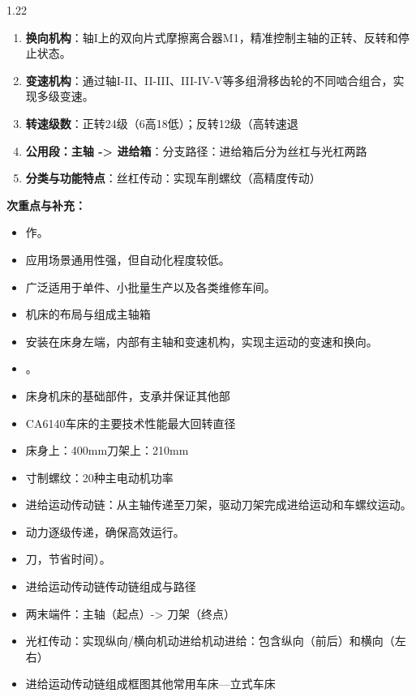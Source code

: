 \documentclass[12pt,a4paper]{article}
\begin{document}
\begin{spacing}{1.22}
\begin{tcolorbox}[colback=yellow!6,colframe=red!55!black,title=重点,left=1mm,right=1mm]
\begin{enumerate}[leftmargin=2.2em,label=\arabic*.]
  \item \textbf{换向机构}：轴I上的双向片式摩擦离合器M1，精准控制主轴的正转、反转和停止状态。
  \item \textbf{变速机构}：通过轴I-II、II-III、III-IV-V等多组滑移齿轮的不同啮合组合，实现多级变速。
  \item \textbf{转速级数}：正转24级（6高18低）；反转12级（高转速退
  \item \textbf{公用段：主轴 -> 进给箱}：分支路径：进给箱后分为丝杠与光杠两路
  \item \textbf{分类与功能特点}：丝杠传动：实现车削螺纹（高精度传动）
\end{enumerate}
\end{tcolorbox}
\noindent\textbf{次重点与补充：}
\begin{itemize}[leftmargin=2.2em,label=--]
  \item 作。
  \item 应用场景通用性强，但自动化程度较低。
  \item 广泛适用于单件、小批量生产以及各类维修车间。
  \item 机床的布局与组成主轴箱
  \item 安装在床身左端，内部有主轴和变速机构，实现主运动的变速和换向。
  \item 。
  \item 床身机床的基础部件，支承并保证其他部
  \item CA6140车床的主要技术性能最大回转直径
  \item 床身上：400mm刀架上：210mm
  \item 寸制螺纹：20种主电动机功率
  \item 进给运动传动链：从主轴传递至刀架，驱动刀架完成进给运动和车螺纹运动。
  \item 动力逐级传递，确保高效运行。
  \item 刀，节省时间）。
  \item 进给运动传动链传动链组成与路径
  \item 两末端件：主轴（起点）-> 刀架（终点）
  \item 光杠传动：实现纵向/横向机动进给机动进给：包含纵向（前后）和横向（左右）
  \item 进给运动传动链组成框图其他常用车床—立式车床
\end{itemize}


\end{spacing}
\end{document}
